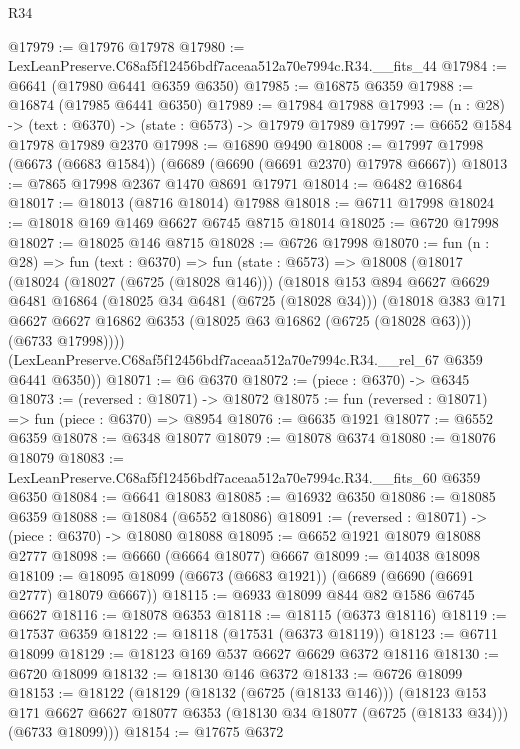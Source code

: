 \begin{lexlean}{R34}
\begin{coremodule}
@17979 := @17976 @17978
@17980 := LexLeanPreserve.C68af5f12456bdf7aceaa512a70e7994c.R34.__fits_44
@17984 := @6641 (@17980 @6441 @6359 @6350)
@17985 := @16875 @6359
@17988 := @16874 (@17985 @6441 @6350)
@17989 := @17984 @17988
@17993 := (n : @28) -> (text : @6370) -> (state : @6573) -> @17979 @17989
@17997 := @6652 @1584 @17978 @17989 @2370
@17998 := @16890 @9490
@18008 := @17997 @17998 (@6673 (@6683 @1584)) (@6689 (@6690 (@6691 @2370) @17978 @6667))
@18013 := @7865 @17998 @2367 @1470 @8691 @17971
@18014 := @6482 @16864
@18017 := @18013 (@8716 @18014) @17988
@18018 := @6711 @17998
@18024 := @18018 @169 @1469 @6627 @6745 @8715 @18014
@18025 := @6720 @17998
@18027 := @18025 @146 @8715
@18028 := @6726 @17998
@18070 := fun (n : @28) =>
  fun (text : @6370) =>
  fun (state : @6573) =>
  @18008
    (@18017
      (@18024
        (@18027 (@6725 (@18028 @146)))
        (@18018
          @153
          @894
          @6627
          @6629
          @6481
          @16864
          (@18025 @34 @6481 (@6725 (@18028 @34)))
          (@18018
            @383
            @171
            @6627
            @6627
            @16862
            @6353
            (@18025 @63 @16862 (@6725 (@18028 @63)))
            (@6733 @17998))))
      (LexLeanPreserve.C68af5f12456bdf7aceaa512a70e7994c.R34.__rel_67 @6359 @6441 @6350))
@18071 := @6 @6370
@18072 := (piece : @6370) -> @6345
@18073 := (reversed : @18071) -> @18072
@18075 := fun (reversed : @18071) => fun (piece : @6370) => @8954
@18076 := @6635 @1921
@18077 := @6552 @6359
@18078 := @6348 @18077
@18079 := @18078 @6374
@18080 := @18076 @18079
@18083 := LexLeanPreserve.C68af5f12456bdf7aceaa512a70e7994c.R34.__fits_60 @6359 @6350
@18084 := @6641 @18083
@18085 := @16932 @6350
@18086 := @18085 @6359
@18088 := @18084 (@6552 @18086)
@18091 := (reversed : @18071) -> (piece : @6370) -> @18080 @18088
@18095 := @6652 @1921 @18079 @18088 @2777
@18098 := @6660 (@6664 @18077) @6667
@18099 := @14038 @18098
@18109 := @18095 @18099 (@6673 (@6683 @1921)) (@6689 (@6690 (@6691 @2777) @18079 @6667))
@18115 := @6933 @18099 @844 @82 @1586 @6745 @6627
@18116 := @18078 @6353
@18118 := @18115 (@6373 @18116)
@18119 := @17537 @6359
@18122 := @18118 (@17531 (@6373 @18119))
@18123 := @6711 @18099
@18129 := @18123 @169 @537 @6627 @6629 @6372 @18116
@18130 := @6720 @18099
@18132 := @18130 @146 @6372
@18133 := @6726 @18099
@18153 := @18122
    (@18129
      (@18132 (@6725 (@18133 @146)))
      (@18123
        @153
        @171
        @6627
        @6627
        @18077
        @6353
        (@18130 @34 @18077 (@6725 (@18133 @34)))
        (@6733 @18099)))
@18154 := @17675 @6372

\end{coremodule}
\end{lexlean}
